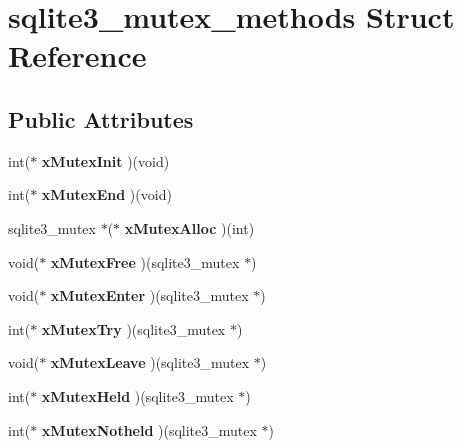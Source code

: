 \hypertarget{structsqlite3__mutex__methods}{}\section{sqlite3\+\_\+mutex\+\_\+methods Struct Reference}
\label{structsqlite3__mutex__methods}
\subsection*{Public Attributes}
\begin{DoxyCompactItemize}
\item 
\mbox{\label{structsqlite3__mutex__methods_af0a78d79b6029444d4a2ac7c474030d4}} 
int($\ast$ {\bfseries x\+Mutex\+Init} )(void)
\item 
\mbox{\label{structsqlite3__mutex__methods_a4963efb4bfede244d4d2a14510dbfe68}} 
int($\ast$ {\bfseries x\+Mutex\+End} )(void)
\item 
\mbox{\label{structsqlite3__mutex__methods_a1092d5c1659c494c5235e884def5e275}} 
sqlite3\+\_\+mutex $\ast$($\ast$ {\bfseries x\+Mutex\+Alloc} )(int)
\item 
\mbox{\label{structsqlite3__mutex__methods_a4e58d446a7225ce91073eb0af91d219a}} 
void($\ast$ {\bfseries x\+Mutex\+Free} )(sqlite3\+\_\+mutex $\ast$)
\item 
\mbox{\label{structsqlite3__mutex__methods_ac60f7bb165e9770949a8a2b2c2632830}} 
void($\ast$ {\bfseries x\+Mutex\+Enter} )(sqlite3\+\_\+mutex $\ast$)
\item 
\mbox{\label{structsqlite3__mutex__methods_a45682df41bdfcb267a696090c80ebd06}} 
int($\ast$ {\bfseries x\+Mutex\+Try} )(sqlite3\+\_\+mutex $\ast$)
\item 
\mbox{\label{structsqlite3__mutex__methods_acfa193f9130bfc68caf7f1849bcd0dac}} 
void($\ast$ {\bfseries x\+Mutex\+Leave} )(sqlite3\+\_\+mutex $\ast$)
\item 
\mbox{\label{structsqlite3__mutex__methods_a5d30a95c614bc08fe156c9ea0f0d88e8}} 
int($\ast$ {\bfseries x\+Mutex\+Held} )(sqlite3\+\_\+mutex $\ast$)
\item 
\mbox{\label{structsqlite3__mutex__methods_a7bc1edfd01c67c6dcee26299bc31a7bf}} 
int($\ast$ {\bfseries x\+Mutex\+Notheld} )(sqlite3\+\_\+mutex $\ast$)
\end{DoxyCompactItemize}


